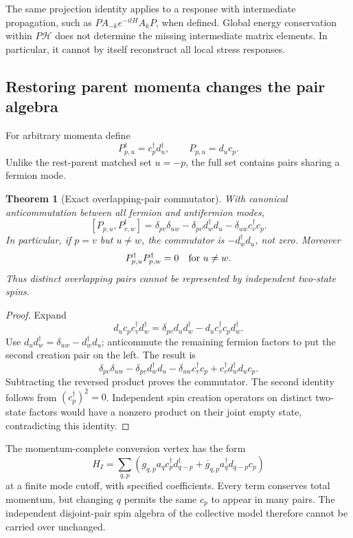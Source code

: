 \documentclass[11pt]{article}
\newtheorem{theorem}{Theorem}[section]
\theoremstyle{remark}
\begin{document}
The same projection identity applies to a response
with intermediate propagation, such as
\(PA_{-k}e^{-itH}A_kP\), when defined.
Global energy conservation within \(P\mathcal H\)
does not determine the missing intermediate matrix
elements.  In particular, it cannot by itself
reconstruct all local stress responses.

\subsection{Restoring parent momenta changes the pair algebra}

For arbitrary momenta define
\[
 P_{p,u}^\dagger=c_p^\dagger d_u^\dagger,\qquad
 P_{p,u}=d_uc_p .
\]
Unlike the rest-parent matched set \(u=-p\), the
full set contains pairs sharing a fermion mode.

\begin{theorem}[Exact overlapping-pair commutator]
\label{thm:v20v68-overlap}
With canonical anticommutation between all fermion
and antifermion modes,
\[
 [P_{p,u},P_{v,w}^\dagger]
 =\delta_{pv}\delta_{uw}
       -\delta_{pv}d_w^\dagger d_u
       -\delta_{uw}c_v^\dagger c_p .
\]
In particular, if \(p=v\) but \(u\ne w\), the
commutator is \(-d_w^\dagger d_u\), not zero.
Moreover
\[
 P_{p,u}^\dagger P_{p,w}^\dagger=0
 \quad\hbox{for }u\ne w .
\]
Thus distinct overlapping pairs cannot be represented
by independent two-state spins.
\end{theorem}
\begin{proof}
Expand
\[
 d_uc_pc_v^\dagger d_w^\dagger
   =\delta_{pv}d_ud_w^\dagger-d_uc_v^\dagger c_pd_w^\dagger .
\]
Use \(d_ud_w^\dagger=\delta_{uw}-d_w^\dagger d_u\);
anticommute the remaining fermion factors to put the
second creation pair on the left.  The result is
\[
 \delta_{pv}\delta_{uw}-\delta_{pv}d_w^\dagger d_u
 -\delta_{uw}c_v^\dagger c_p+
                  c_v^\dagger d_w^\dagger d_uc_p .
\]
Subtracting the reversed product proves the commutator.
The second identity follows from \((c_p^\dagger)^2=0\).
Independent spin creation operators on distinct
two-state factors would have a nonzero product on
their joint empty state, contradicting this identity.
\end{proof}

The momentum-complete conversion vertex has the form
\[
 H_I=\sum_{q,p}
 \left(g_{q,p}a_qc_p^\dagger d_{q-p}^\dagger+
       \overline g_{q,p}a_q^\dagger d_{q-p}c_p\right)
\]
at a finite mode cutoff, with specified coefficients.
Every term conserves total momentum, but changing
\(q\) permits the same \(c_p\) to appear in many
pairs.  The independent disjoint-pair spin algebra
of the collective model therefore cannot be carried
over unchanged.
\end{document}
